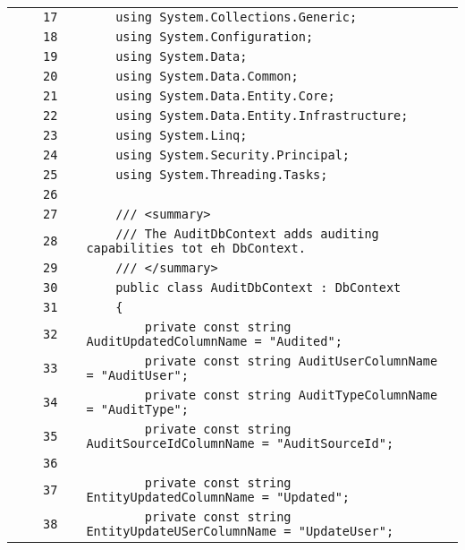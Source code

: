 \documentclass[a4paper,10pt]{article}
\begin{document}
\begin{longtable}[l]{lrrll}
\cellcolor{gray} &  & \verb~17~ & & \verb~    using System.Collections.Generic;~\\
\cellcolor{gray} &  & \verb~18~ & & \verb~    using System.Configuration;~\\
\cellcolor{gray} &  & \verb~19~ & & \verb~    using System.Data;~\\
\cellcolor{gray} &  & \verb~20~ & & \verb~    using System.Data.Common;~\\
\cellcolor{gray} &  & \verb~21~ & & \verb~    using System.Data.Entity.Core;~\\
\cellcolor{gray} &  & \verb~22~ & & \verb~    using System.Data.Entity.Infrastructure;~\\
\cellcolor{gray} &  & \verb~23~ & & \verb~    using System.Linq;~\\
\cellcolor{gray} &  & \verb~24~ & & \verb~    using System.Security.Principal;~\\
\cellcolor{gray} &  & \verb~25~ & & \verb~    using System.Threading.Tasks;~\\
\cellcolor{gray} &  & \verb~26~ & & \verb~~\\
\cellcolor{gray} &  & \verb~27~ & & \verb~    /// <summary>~\\
\cellcolor{gray} &  & \verb~28~ & & \verb~    /// The AuditDbContext adds auditing capabilities tot eh DbContext.~\\
\cellcolor{gray} &  & \verb~29~ & & \verb~    /// </summary>~\\
\cellcolor{gray} &  & \verb~30~ & & \verb~    public class AuditDbContext : DbContext~\\
\cellcolor{gray} &  & \verb~31~ & & \verb~    {~\\
\cellcolor{gray} &  & \verb~32~ & & \verb~        private const string AuditUpdatedColumnName = "Audited";~\\
\cellcolor{gray} &  & \verb~33~ & & \verb~        private const string AuditUserColumnName = "AuditUser";~\\
\cellcolor{gray} &  & \verb~34~ & & \verb~        private const string AuditTypeColumnName = "AuditType";~\\
\cellcolor{gray} &  & \verb~35~ & & \verb~        private const string AuditSourceIdColumnName = "AuditSourceId";~\\
\cellcolor{gray} &  & \verb~36~ & & \verb~~\\
\cellcolor{gray} &  & \verb~37~ & & \verb~        private const string EntityUpdatedColumnName = "Updated";~\\
\cellcolor{gray} &  & \verb~38~ & & \verb~        private const string EntityUpdateUSerColumnName = "UpdateUser";~\\

\end{longtable}
\end{document}
